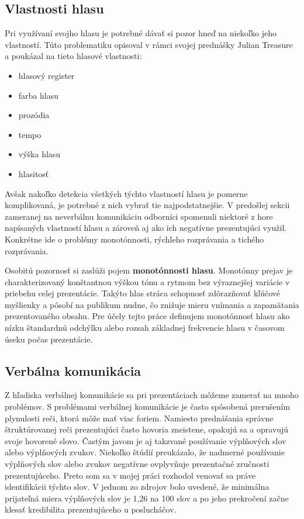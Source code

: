 \subsection{Vlastnosti hlasu}
Pri využívaní svojho hlasu je potrebné dávať si pozor hneď na niekoľko jeho vlastností. Túto problematiku opisoval v rámci svojej prednášky Julian Treasure\cite{voice} a poukázal na tieto hlasové vlastnosti:
\begin{itemize}
    \item hlasový register
    \item farba hlasu
    \item prozódia
    \item tempo
    \item výška hlasu
    \item hlasitosť
\end{itemize}
Avšak nakoľko detekcia všetkých týchto vlastností hlasu je pomerne komplikovaná, je potrebné z nich vybrať tie najpodstatnejšie. V predošlej sekcii zameranej na neverbálnu komunikáciu odborníci spomenuli niektoré z hore napísaných vlastností hlasu a zároveň aj ako ich negatívne prezentujúci využil. Konkrétne ide o problémy monotónnosti, rýchleho rozprávania a tichého rozprávania.

Osobitú pozornosť si zaslúži pojem \textbf{monotónnosti hlasu}. Monotónny prejav je charakterizovaný konštantnou výškou tónu a rytmom bez výraznejšej variácie v priebehu celej prezentácie. Takýto hlas stráca schopnosť zdôrazňovať kľúčové myšlienky a pôsobí na publikum nudne, čo znižuje mieru vnímania a zapamätania prezentovaného obsahu\cite{voice_two}. Pre účely tejto práce definujem monotónnosť hlasu ako nízku štandardnú odchýlku alebo rozsah základnej frekvencie hlasu v časovom úseku počas prezentácie.

\subsection{Verbálna komunikácia}
Z hľadiska verbálnej komunikácie sa pri prezentáciach môžeme zamerať na mnoho problémov. S problémami verbálnej komunikácie je často spôsobená prerušením plynulosti reči, ktorá môže mať viac foriem. Namiesto prednášania správne štruktúrovanej reči prezentujúci často hovoria zneistene, opakujú sa a opravujú svoje hovorené slovo.\cite{disfluencies} Častým javom je aj takzvané používanie výplňových slov alebo výplňových zvukov. Niekoľko štúdií preukázalo, že nadmerné používanie výplňových slov alebo zvukov negatívne ovplyvňuje prezentačné zručnosti prezentujúceho.\cite{fillerEffects} \cite{fillerWords} Preto som sa v mojej práci rozhodol venovať sa práve identifikácii týchto slov. V jednom zo zdrojov bolo uvedené, že minimálna prijateľná miera výplňových slov je 1,26 na 100 slov a po jeho prekročení začne klesať kredibilita prezentujúceho u poslucháčov. \cite{fillerWords}

